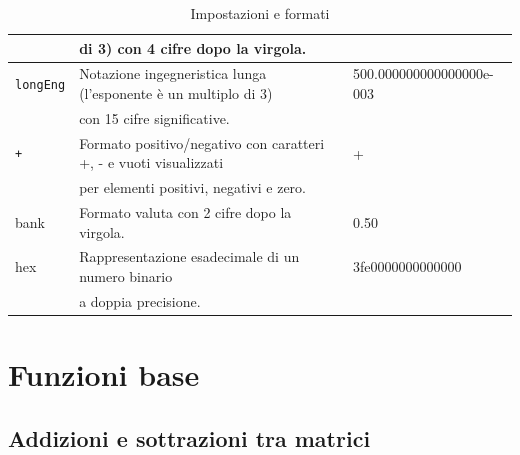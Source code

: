 \documentclass{book}
\begin{document}
\begin{table}[ht]
\begin{tabular}{lll}
               &di 3) con 4 cifre dopo la virgola.\\\hline
    \lstinline|longEng| & Notazione ingegneristica lunga (l'esponente è un multiplo di 3) & 500.000000000000000e-003\\ & con 15 cifre significative.\\\hline
    \lstinline|+|&Formato positivo/negativo con caratteri +, - e vuoti visualizzati & +\\
               & per elementi positivi, negativi e zero.\\\hline
    bank & Formato valuta con 2 cifre dopo la virgola. & 0.50 \\\hline
    hex & Rappresentazione esadecimale di un numero binario & 3fe0000000000000 \\
               & a doppia precisione.\\\hline 
  \end{tabular}
  \caption{Impostazioni e formati}
  \label{tab:form}
\end{table}

\chapter{Funzioni base}
\label{chap:funbase}

\section{Addizioni e sottrazioni tra matrici}
\label{sec:addesottmtx}
\end{document}
